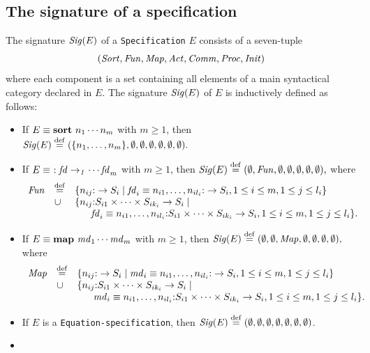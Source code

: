 \documentclass[fleqn,a4paper]{article}
\newcommand{\Sig}{\nm{Sig}}
\newcommand{\Fun}{\nm{Fun}}
\newcommand{\wor}{\stackrel{\mathrm{def}}{=}}
\begin{document}
\subsection{The signature of a specification}
\begin{defn}
  The signature $\Sig(E)$ of a {\tt Specification} $E$ consists of a
  seven-tuple \[(\Sort,\Fun,\Map,\Act,\Comm,\Proc,\Init)\] where
  each component is a set containing all elements of a main syntactical category
  declared in $E$.
  The signature $\Sig(E)$ of $E$ is inductively defined as follows:
  \newcommand{\fd}{{\it fd}}
  \newcommand{\md}{{\it md}}
  \newcommand{\pe}{{\it pe}}
  \newcommand{\ad}{{\it ad}}
  \begin{itemize}
  \item
    If $E\equiv \mathbf{sort}~n_1\cdots n_m$ with $m\geq 1$,
    then
    $\Sig(E)\wor(\{n_1,\ldots,n_m\},\emptyset,\emptyset,\emptyset,
    \emptyset,\emptyset,\emptyset).$
\item
If $E\equiv
\func~\fd_1\cdots \fd_m$ with $m\geq 1$,
then
$\Sig(E)\wor(\emptyset,\Fun,
\emptyset,\emptyset,
\emptyset,\emptyset,\emptyset),$
where \[\begin{array}{lll}
\Fun &\wor&
\{n_{ij}\ap \rightarrow S_i\mid \fd_i\equiv
n_{i1},\ldots,n_{il_i}\ap \rightarrow S_i, 1\leq i\leq m, 1\leq j\leq
l_i\}\\
&\cup&\{n_{ij}\ap S_{i1}\times\cdots\times S_{ik_i}\rightarrow S_i\mid\\
&&~~~~~\fd_i\equiv
n_{i1},\ldots,n_{il_i}\ap S_{i1}\times\cdots\times S_{ik_i}\rightarrow
S_i, 1\leq i\leq
m, 1\leq j\leq l_i\}.
\end{array}
\]
\item
If $E\equiv
\mapkw~\md_1\cdots \md_m$ with $m\geq 1$,
then
$\Sig(E)\wor(\emptyset,\emptyset,\Map, \emptyset,\emptyset,
\emptyset,\emptyset),$
where \[\begin{array}{lll}
\Map &\wor&
\{n_{ij}\ap \rightarrow S_i\mid \md_i\equiv
n_{i1},\ldots,n_{il_i}\ap \rightarrow S_i, 1\leq i\leq m, 1\leq j\leq
l_i\}\\
&\cup&\{n_{ij}\ap S_{i1}\times\cdots\times S_{ik_i}\rightarrow S_i\mid\\
&&~~~~~\md_i\equiv
n_{i1},\ldots,n_{il_i}\ap S_{i1}\times\cdots\times S_{ik_i}\rightarrow
S_i, 1\leq i\leq
m, 1\leq j\leq l_i\}.
\end{array}
\]
\item
If $E$ is a {\tt Equation-specification},
then
$\Sig(E)\wor(\emptyset,\emptyset,\emptyset,\emptyset,\emptyset,\emptyset,\emptyset)$.
\item

\end{itemize}
\end{defn}
\end{document}
